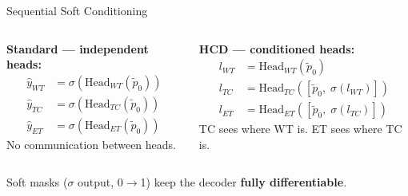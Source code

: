 \documentclass[aspectratio=169]{beamer}
\begin{document}
\begin{frame}{Sequential Soft Conditioning}
  \vspace{0.5em}
  \begin{columns}
      \textbf{Standard — independent heads:}
      \vspace{0.3em}
      \begin{align*}
        \hat{y}_{WT} &= \sigma(\text{Head}_{WT}(\tilde{p}_0)) \\
        \hat{y}_{TC} &= \sigma(\text{Head}_{TC}(\tilde{p}_0)) \\
        \hat{y}_{ET} &= \sigma(\text{Head}_{ET}(\tilde{p}_0))
      \end{align*}
      \small No communication between heads.

      \textbf{HCD — conditioned heads:}
      \vspace{0.3em}
      \begin{align*}
        l_{WT} &= \text{Head}_{WT}(\tilde{p}_0) \\
        l_{TC} &= \text{Head}_{TC}([\tilde{p}_0,\; \sigma(l_{WT})]) \\
        l_{ET} &= \text{Head}_{ET}([\tilde{p}_0,\; \sigma(l_{TC})])
      \end{align*}
      \small TC sees where WT is. ET sees where TC is.
  \end{columns}

  \vspace{1em}
  \begin{center}
    \textcolor{primary}{Soft masks ($\sigma$ output, 0$\to$1) keep the decoder \textbf{fully differentiable}.}
  \end{center}
\end{frame}
\end{document}
